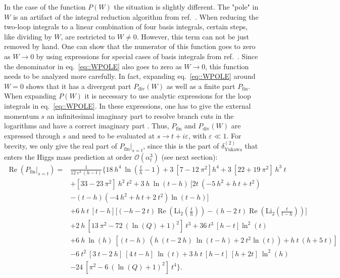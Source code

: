 \documentclass[a4paper,12pt]{book}
\begin{document}
In the case of the function $P(W)$ the situation is slightly different. The "pole" in $W$ is an artifact of the integral reduction algorithm from ref.\ \cite{tarasov}. When reducing the two-loop integrals to a linear combination of four basis integrals, certain steps, like dividing by $W$, are restricted to $W\neq0$.  However, this term can not be just removed by hand. One can show that the numerator of this function goes to zero as $W\rightarrow 0$ by using expressions for special cases of basis integrals from ref.\ \cite{martinloops}. Since the denominator in eq.\ \eqref{eq::WPOLE} also goes to zero as $W\rightarrow 0$, this function needs to be analyzed more carefully. In fact, expanding  eq.\ \eqref{eq::WPOLE} around $W=0$ shows that it has a divergent part $P_\text{div}(W)$ as well as a finite part $P_\text{fin}$. When expanding $P(W)$ it is necessary to use analytic expressions for the loop integrals in eq.\ \eqref{eq::WPOLE}. In these expressions, one has to give the external momentum $s$ an infinitesimal imaginary part to resolve branch cuts in the logarithms and have a correct imaginary part \cite{martinloops}. Thus, $P_\text{fin}$ and $P_\text{div}(W)$ are expressed through $s$ and need to be evaluated at $s\rightarrow t+i\varepsilon$, with $\varepsilon \ll 1$. For brevity, we only give the real part of $P_\text{fin}|_{s=t}$, since this is the part of $\delta^{(2)}_\text{Yukawa}$ that enters the Higgs mass prediction at order $\mathcal{O}(\alpha_t^3)$ (see next section):
\begin{align}
\nonumber
\operatorname{Re}(P_\text{fin}|_{s=t})={}& \frac{1}{12 \>v^4 \>(h-t)}\biggl\{18\> h^4\> \ln \left(\frac{t}{h}-1\right)+3\> [7-12\> \pi ^2]
h^4+3\> [22+19\> \pi ^2]\>
   h^3\> t\\
   \nonumber
&+[33-23\> \pi ^2]\> h^2\> t^2+3\> h\> \ln \left(t-h\right) \>[2 t\>
(-5\> h^2+h\> t+t^2)\\
\nonumber
&-(t-h)
   (-4 \>h^2+h\> t+2\> t^2) \ln \left(t-h\right)]\\
   \nonumber
   &+6\> h\> t\> [t-h]
\biggl[(-h-2\> t)
   \operatorname{Re}\left(\text{Li}_2\left(\frac{t}{h}\right)\right)-(h-2\> t)
   \operatorname{Re}\left(\text{Li}_2\left(\frac{t}{t-h}\right)\right)\biggr]\\
   \nonumber 
   &+2 \>h\>
[13 \>\pi^2-72\> (\ln(Q)+1)^2]\>
   t^3+36 \>t^3 \>[h-t] \ln ^2(t)\\
   \nonumber
   &+6\> h\> \ln (h) \>[(t-h)\> (h\> (t-2\> h)\> \ln (t-h)+2\> t^2 \ln
   (t))+h\> t\> (h+5\> t)]\\   
   \nonumber
   &-6\> t^2 \>[3\> t-2\> h]\> [4\> t-h]\> \ln (t)+3\> h\> t
\>[h-t]\> [h+2 t]\> \ln ^2(h)\\
&-24\>
   [\pi^2-6\> (\ln(Q)+1)^2]\> t^4\biggr\}.
\end{align} 
\end{document}
